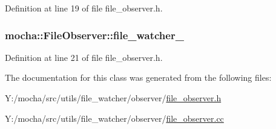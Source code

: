 Definition at line 19 of file file\_\-observer.h.

\hypertarget{classmocha_1_1_file_observer_a2e810173e7300cd84a5fd830fc5538ce}{
\subsubsection[{file\_\-watcher\_\-}]{ {\bf mocha::FileObserver::file\_\-watcher\_\-}}}
\label{classmocha_1_1_file_observer_a2e810173e7300cd84a5fd830fc5538ce}


Definition at line 21 of file file\_\-observer.h.



The documentation for this class was generated from the following files:\begin{DoxyCompactItemize}
\item 
Y:/mocha/src/utils/file\_\-watcher/observer/\hyperlink{file__observer_8h}{file\_\-observer.h}\item 
Y:/mocha/src/utils/file\_\-watcher/observer/\hyperlink{file__observer_8cc}{file\_\-observer.cc}\end{DoxyCompactItemize}
